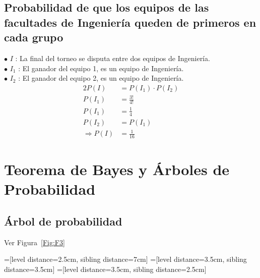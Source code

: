 \documentclass[paper=letterpaper]{article}
\begin{document}
\subsection{Probabilidad de que los equipos de las facultades de Ingeniería queden de primeros en cada grupo}
$\bullet$ $I$ : La final del torneo se disputa entre dos equipos de Ingeniería. \\
$\bullet$ $I_1$ : El ganador del equipo 1, es un equipo de Ingeniería. \\
$\bullet$ $I_2$ : El ganador del equipo 2, es un equipo de Ingeniería.
\\
\begin{alignat*}{2}
P(I) &= P(I_1)\cdot P(I_2) \\
P(I_1) &= \frac{3!}{4!} \\
P(I_1) &= \frac{1}{4} \\
P(I_2) &= P(I_1) \\
\Rightarrow P(I) &= \frac{1}{16}
\end{alignat*}

\section{Teorema de Bayes y Árboles de Probabilidad}
\subsection{Árbol de probabilidad}
Ver Figura~\ref{Fig:F3}

=[level distance=2.5cm, sibling distance=7cm]
=[level distance=3.5cm, sibling distance=3.5cm]
=[level distance=3.5cm, sibling distance=2.5cm]
\end{document}
